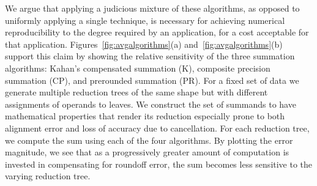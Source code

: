 We argue that applying a judicious mixture of these algorithms, as
opposed to uniformly applying a single technique, is necessary for
achieving numerical reproducibility to the degree required by an
application, for a cost acceptable for that application.
Figures~\ref{fig:avgalgorithms}(a) and~\ref{fig:avgalgorithms}(b)
support this claim by showing the relative sensitivity of the three
summation algorithms: Kahan's compensated summation (K), composite
precision summation (CP), and prerounded summation (PR).  For a fixed
set of data we generate multiple reduction trees of the same shape but
with different assignments of operands to leaves. We construct the set
of summands to have mathematical properties that render its reduction
especially prone to both alignment error and loss of accuracy due to
cancellation. For each reduction tree, we compute the sum using each
of the four algorithms. By plotting the error magnitude, we see that
as a progressively greater amount of computation is invested in
compensating for roundoff error, the sum becomes less sensitive to the
varying reduction tree.
